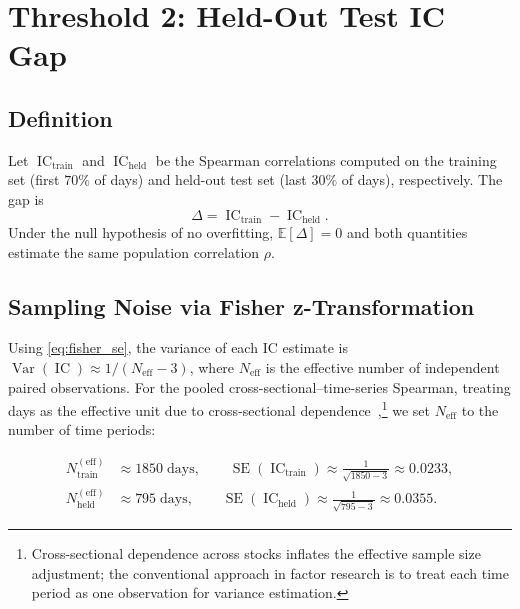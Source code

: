 \documentclass[11pt,a4paper]{article}
\theoremstyle{definition}
\newcommand{\IC}{\operatorname{IC}}
\newcommand{\Var}{\operatorname{Var}}
\newcommand{\E}{\mathbb{E}}
\newcommand{\SE}{\operatorname{SE}}
\begin{document}
\section{Threshold 2: Held-Out Test IC Gap}

\subsection{Definition}

Let $\IC_{\text{train}}$ and $\IC_{\text{held}}$ be the Spearman correlations
computed on the training set (first $70\%$ of days) and held-out test set
(last $30\%$ of days), respectively.  The gap is
\begin{equation}
    \Delta = \IC_{\text{train}} - \IC_{\text{held}}.
\end{equation}
Under the null hypothesis of no overfitting, $\E[\Delta] = 0$ and both
quantities estimate the same population correlation $\rho$.

\subsection{Sampling Noise via Fisher z-Transformation}

Using \eqref{eq:fisher_se}, the variance of each IC estimate is
$\Var(\IC) \approx 1/(N_{\text{eff}} - 3)$, where $N_{\text{eff}}$ is the
effective number of independent paired observations.  For the pooled
cross-sectional--time-series Spearman, treating days as the effective unit
due to cross-sectional dependence~\cite{chordia2001},\footnote{Cross-sectional
dependence across stocks inflates the effective sample size adjustment; the
conventional approach in factor research is to treat each time period as one
observation for variance estimation.} we set $N_{\text{eff}}$ to the number
of time periods:

\begin{align}
    N_{\text{train}}^{({\text{eff}})} &\approx 1850\;\text{days},
    \qquad
    \SE(\IC_{\text{train}}) \approx \frac{1}{\sqrt{1850-3}} \approx 0.0233, \\[4pt]
    N_{\text{held}}^{({\text{eff}})} &\approx 795\;\text{days},
    \qquad
    \SE(\IC_{\text{held}}) \approx \frac{1}{\sqrt{795-3}} \approx 0.0355.
\end{align}
\end{document}
